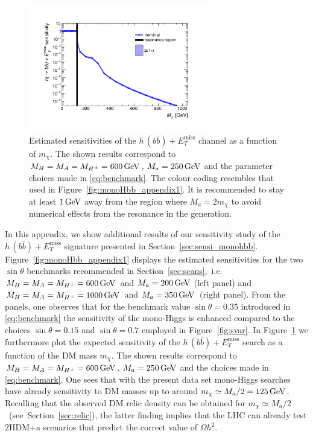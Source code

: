 \documentclass[a4paper, 11pt,notoc]{article}
\newcommand{\MET}{\ensuremath{E_T^\mathrm{miss}}\xspace}
\newcommand{\mA}{\ensuremath{M_{A}}\xspace}
\newcommand{\ma}{\ensuremath{M_{a}}\xspace}
\newcommand{\mH}{\ensuremath{M_{H}}\xspace}
\newcommand{\mHc}{\ensuremath{M_{H^{\pm}}}\xspace}
\newcommand{\hdma}{\ensuremath{\textrm{2HDM+a}}\xspace}
\begin{document}
\begin{figure}[t!]
\centering
\includegraphics[width=0.7\textwidth]{monoHbb_sensi_mDM_scan_red.pdf}
\vspace{-2mm}
\caption{Estimated sensitivities of  the $h \, (b \bar b)+\MET$ channel as a function of $m_\chi$. The shown results correspond to $\mH = \mA = \mHc = 600 \, {\rm GeV}$, $\ma = 250 \, {\rm GeV}$ and the parameter choices made in \eqref{eq:benchmark}. The colour coding resembles that used in Figure~\ref{fig:monoHbb_appendix1}. It is recommended to stay at least $1 \, {\rm GeV}$ away from the region where $\ma = 2 m_\chi$ to avoid numerical effects from the resonance in the generation. }
\label{fig:monoHbb_appendix2}
\end{figure}

In this appendix, we  show additional results  of our sensitivity study of the $h \, (b \bar b)+\MET$ signature presented in Section~\ref{sec:sensi_monohbb}. Figure~\ref{fig:monoHbb_appendix1} displays the estimated sensitivities for the two $\sin \theta$ benchmarks recommended in Section~\ref{sec:scans},~i.e.~$\mH = \mA = \mHc = 600 \, {\rm GeV}$ and $\ma = 200 \, {\rm GeV}$ (left panel) and $\mH = \mA = \mHc = 1000 \, {\rm GeV}$ and $\ma = 350 \, {\rm GeV}$~(right panel). From the panels, one observes that for the benchmark value $\sin \theta = 0.35$ introduced in \eqref{eq:benchmark} the sensitivity of the mono-Higgs is enhanced compared to the choices  $\sin \theta = 0.15$ and  $\sin \theta = 0.7$ employed in Figure~\ref{fig:svar}. In Figure~\ref{fig:monoHbb_appendix2} we furthermore  plot the expected sensitivity of the $h \, (b \bar b)+\MET$ search as a function of the DM mass $m_\chi$. The shown results correspond to $\mH = \mA = \mHc = 600 \, {\rm GeV}$, $\ma = 250 \, {\rm GeV}$ and the choices made in \eqref{eq:benchmark}. One sees that with the present data set mono-Higgs searches have already sensitivity to DM masses up to around $m_\chi \simeq \ma/2 = 125 \, {\rm GeV}$. Recalling that the  observed DM relic density can be obtained for $m_\chi \simeq \ma/2$ ~(see~Section~\ref{sec:relic}), the latter finding implies that the LHC can already test  \hdma scenarios that predict the correct value of $\Omega h^2$. 



\end{document}
